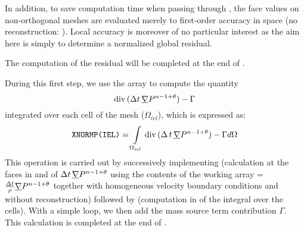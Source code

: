 In addition, to save computation time when passing through , the face values on non-orthogonal meshes are evaluated merely to first-order accuracy in space (no reconstruction: ). Local accuracy is moreover of no particular interest as the aim here is simply to determine a normalized global residual.

The computation of the residual will be completed at the end of .



During this first step, we use the array  to compute the quantity $$\text{div}\,(\Delta t \,\underline{\nabla}{P^{n-1+\theta}})-\Gamma$$ integrated over each cell  of the mesh ($\Omega_{iel}$), which is expressed as:
$$\text{\texttt{XNORMP(IEL)}}=\int\limits_{\Omega_{iel}}{\text{div}\,(\Delta\,t\,\underline{\nabla}{P^{n-1+\theta}})-\Gamma
d\Omega}$$
This operation is carried out by successively implementing 
(calculation at the faces in  and  of $\Delta t\,\underline{\nabla}{P^{n-1+\theta}}$ using the contents of the working array =$\frac{\Delta t}{\rho} \underline{\nabla}{P^{n-1+\theta}}$ together with homogeneous velocity boundary conditions and without reconstruction) followed by  (computation in  of the integral over the cells).  With a simple loop, we then add the mass source term contribution $\Gamma$.
This calculation is completed at the end of .\\


